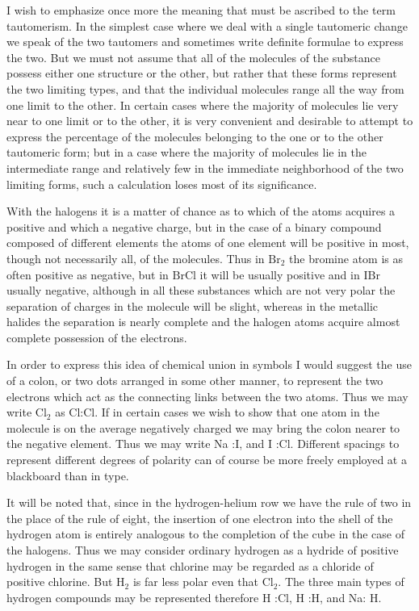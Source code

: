 \documentclass[11pt]{memoir}
\begin{document}
I wish to emphasize once more the meaning that must be ascribed to the term tautomerism.  In the simplest case where we deal with a single tautomeric change we speak of the two tautomers and sometimes write definite formulae to express the two.  But we must not assume that all of the molecules of the substance possess either one structure or the other, but rather that these forms represent the two limiting types, and that the individual molecules range all the way from one limit to the other.  In certain cases where the majority of molecules lie very near to one limit or to the other, it is very convenient and desirable to attempt to express the percentage of the molecules belonging to the one or to the other tautomeric form; but in a case where the majority of molecules lie in the intermediate range and relatively few in the immediate neighborhood of the two limiting forms, such a calculation loses most of its significance.

With the halogens it is a matter of chance as to which of the atoms acquires a positive and which a negative charge, but in the case of a binary compound composed of different elements the atoms of one element will be positive in most, though not necessarily all, of the molecules.  Thus in $\mathrm{Br_2}$ the bromine atom is as often positive as negative, but in $\mathrm{BrCl}$ it will be usually positive and in $\mathrm{IBr}$ usually negative, although in all these substances which are not very polar the separation of charges in the molecule will be slight, whereas in the metallic halides the separation is nearly complete and the halogen atoms acquire almost complete possession of the electrons.

In order to express this idea of chemical union in symbols I would suggest the use of a colon, or two dots arranged in some other manner, to represent the two electrons which act as the connecting links between the two atoms.  Thus we may write $\mathrm{Cl_2}$ as Cl:Cl.  If in certain cases we wish to show that one atom in the molecule is on the average negatively charged we may bring the colon nearer to the negative element.  Thus we may write Na :I, and I :Cl.  Different spacings to represent different degrees of polarity can of course be more freely employed at a blackboard than in type.

It will be noted that, since in the hydrogen-helium row we have the rule of two in the place of the rule of eight, the insertion of one electron into the shell of the hydrogen atom is entirely analogous to the completion of the cube in the case of the halogens.  Thus we may consider ordinary hydrogen as a hydride of positive hydrogen in the same sense that chlorine may be regarded as a chloride of positive chlorine.  But $\mathrm{H_2}$ is far less polar even that $\mathrm{Cl_2}$.  The three main types of hydrogen compounds may be represented therefore H :Cl, H :H, and Na: H.
\end{document}
